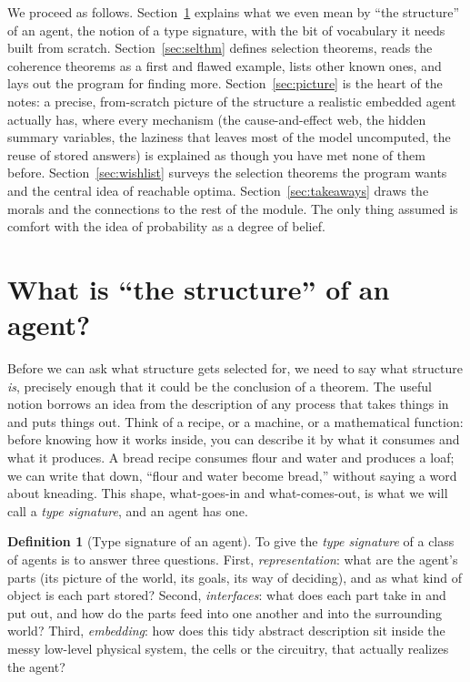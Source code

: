 \documentclass[10pt]{article}
\theoremstyle{definition}
\newtheorem{definition}[theorem]{Definition}
\theoremstyle{remark}
\begin{document}
We proceed as follows. Section~\ref{sec:typesig} explains what we even mean by ``the structure'' of an agent, the notion of a type signature, with the bit of vocabulary it needs built from scratch. Section~\ref{sec:selthm} defines selection theorems, reads the coherence theorems as a first and flawed example, lists other known ones, and lays out the program for finding more. Section~\ref{sec:picture} is the heart of the notes: a precise, from-scratch picture of the structure a realistic embedded agent actually has, where every mechanism (the cause-and-effect web, the hidden summary variables, the laziness that leaves most of the model uncomputed, the reuse of stored answers) is explained as though you have met none of them before. Section~\ref{sec:wishlist} surveys the selection theorems the program wants and the central idea of reachable optima. Section~\ref{sec:takeaways} draws the morals and the connections to the rest of the module. The only thing assumed is comfort with the idea of probability as a degree of belief.

\section{What is ``the structure'' of an agent?}
\label{sec:typesig}

Before we can ask what structure gets selected for, we need to say what structure \emph{is}, precisely enough that it could be the conclusion of a theorem. The useful notion borrows an idea from the description of any process that takes things in and puts things out. Think of a recipe, or a machine, or a mathematical function: before knowing how it works inside, you can describe it by what it consumes and what it produces. A bread recipe consumes flour and water and produces a loaf; we can write that down, ``flour and water become bread,'' without saying a word about kneading. This shape, what-goes-in and what-comes-out, is what we will call a \emph{type signature}, and an agent has one.

\begin{definition}[Type signature of an agent]
\label{def:typesig}
To give the \emph{type signature} of a class of agents is to answer three questions. First, \emph{representation}: what are the agent's parts (its picture of the world, its goals, its way of deciding), and as what kind of object is each part stored? Second, \emph{interfaces}: what does each part take in and put out, and how do the parts feed into one another and into the surrounding world? Third, \emph{embedding}: how does this tidy abstract description sit inside the messy low-level physical system, the cells or the circuitry, that actually realizes the agent?
\end{definition}
\end{document}
